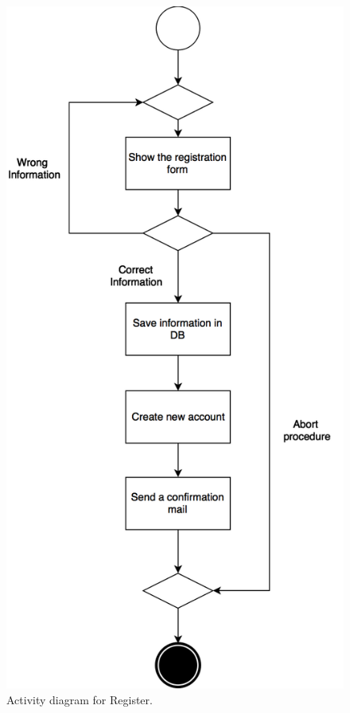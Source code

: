 \documentclass{article}
\begin{document}
	\begin{figure}[h!]
		\bigskip
		\centering
		\includegraphics[scale=0.22]{img/diagrams/register_ad.png}
		\caption{Activity diagram for Register.}
	\end{figure}
\end{document}
